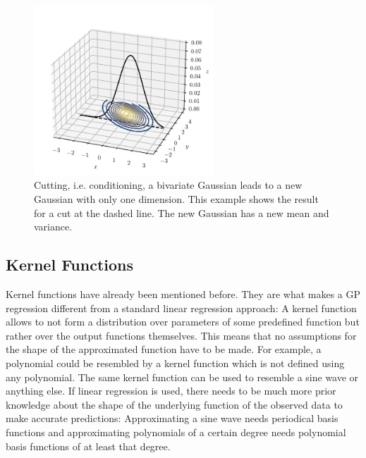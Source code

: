 \documentclass[%
  a4paper,oneside,%
  11pt,%
  smallchapters,
  style=printdev,
  extramargin,
  green,%
  rgb, <cmyk>
  ]{tubsbook}
\begin{document}
%
%
\begin{figure}[!ht]
\begin{center}
\includegraphics[width=0.6\textwidth]{pics/Gaussians3dCut}
\caption{Cutting, i.e. conditioning, a bivariate Gaussian leads to a new Gaussian with only one dimension. This example shows the result for a cut at the dashed line. The new Gaussian has a new mean and variance.}
\label{fig:GaussCut3d}
\end{center}
\end{figure}



\subsection{Kernel Functions}

Kernel functions have already been mentioned before. They are what makes a GP regression different from a standard linear regression approach: A kernel function allows to not form a distribution over parameters of some predefined function but rather over the output functions themselves. This means that no assumptions for the shape of the approximated function have to be made. For example, a polynomial could be resembled by a kernel function which is not defined using any polynomial. The same kernel function can be used to resemble a sine wave or anything else. If linear regression is used, there needs to be much more prior knowledge about the shape of the underlying function of the observed data to make accurate predictions: Approximating a sine wave needs periodical basis functions and approximating polynomials of a certain degree needs polynomial basis functions of at least that degree.
\end{document}
